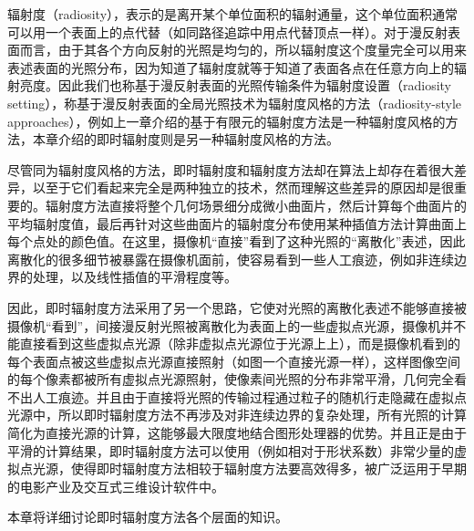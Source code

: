




辐射度（radiosity），表示的是离开某个单位面积的辐射通量，这个单位面积通常可以用一个表面上的点代替（如同路径追踪中用点代替顶点一样）。对于漫反射表面而言，由于其各个方向反射的光照是均匀的，所以辐射度这个度量完全可以用来表述表面的光照分布，因为知道了辐射度就等于知道了表面各点在任意方向上的辐射亮度。因此我们也称基于漫反射表面的光照传输条件为辐射度设置（radiosity setting），称基于漫反射表面的全局光照技术为辐射度风格的方法（radiosity-style approaches），例如上一章介绍的基于有限元的辐射度方法是一种辐射度风格的方法，本章介绍的即时辐射度则是另一种辐射度风格的方法。

尽管同为辐射度风格的方法，即时辐射度和辐射度方法却在算法上却存在着很大差异，以至于它们看起来完全是两种独立的技术，然而理解这些差异的原因却是很重要的。辐射度方法直接将整个几何场景细分成微小曲面片，然后计算每个曲面片的平均辐射度值，最后再针对这些曲面片的辐射度分布使用某种插值方法计算曲面上每个点处的颜色值。在这里，摄像机“直接”看到了这种光照的“离散化”表述，因此离散化的很多细节被暴露在摄像机面前，使容易看到一些人工痕迹，例如非连续边界的处理，以及线性插值的平滑程度等。

因此，即时辐射度方法采用了另一个思路，它使对光照的离散化表述不能够直接被摄像机“看到”，间接漫反射光照被离散化为表面上的一些虚拟点光源，摄像机并不能直接看到这些虚拟点光源（除非虚拟点光源位于光源上上），而是摄像机看到的每个表面点被这些虚拟点光源直接照射（如图一个直接光源一样），这样图像空间的每个像素都被所有虚拟点光源照射，使像素间光照的分布非常平滑，几何完全看不出人工痕迹。并且由于直接将光照的传输过程通过粒子的随机行走隐藏在虚拟点光源中，所以即时辐射度方法不再涉及对非连续边界的复杂处理，所有光照的计算简化为直接光源的计算，这能够最大限度地结合图形处理器的优势。并且正是由于平滑的计算结果，即时辐射度方法可以使用（例如相对于形状系数）非常少量的虚拟点光源，使得即时辐射度方法相较于辐射度方法要高效得多，被广泛运用于早期的电影产业及交互式三维设计软件中。

本章将详细讨论即时辐射度方法各个层面的知识。



